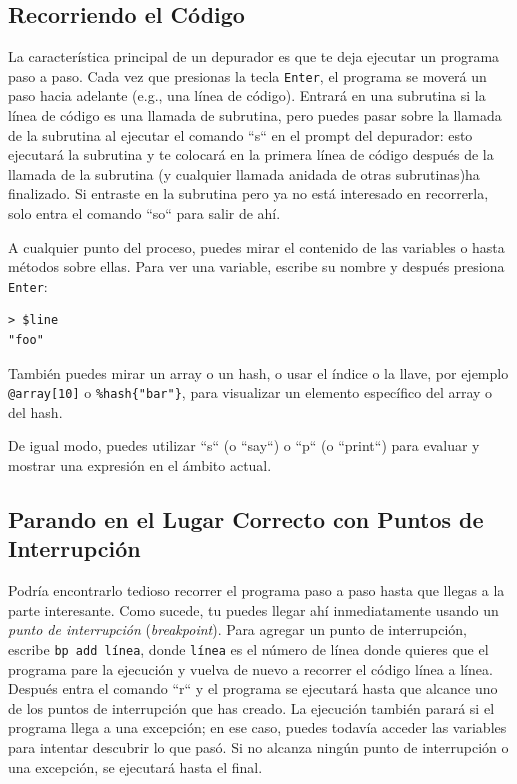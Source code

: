 \subsection{Recorriendo el Código}


La característica principal de un depurador es que
te deja ejecutar un programa paso a paso. Cada vez
que presionas la tecla {\tt Enter}, el programa se
moverá un paso hacia adelante (e.g., una línea de 
código). Entrará en una subrutina si la línea de 
código es una llamada de subrutina, pero puedes pasar 
sobre la llamada de la subrutina al ejecutar el comando
``s`` en el prompt del depurador: esto ejecutará la subrutina
y te colocará en la primera línea de código después de la
llamada de la subrutina (y cualquier llamada anidada de otras
subrutinas)ha finalizado. Si entraste en la subrutina pero ya 
no está interesado en recorrerla, solo entra el comando 
``so`` para salir de ahí.

A cualquier punto del proceso, puedes mirar el contenido 
de las variables o hasta métodos sobre ellas. Para ver
una variable, escribe su nombre y después presiona 
{\tt Enter}:

\begin{lstlisting}
> $line
"foo"
\end{lstlisting}

También puedes mirar un array o un hash, o usar el
índice o la llave, por ejemplo \verb|@array[10]| o
\verb|%hash{"bar"}|, para visualizar un elemento específico
del array o del hash.

De igual modo, puedes utilizar ``s`` (o ``say``) o ``p`` (o ``print``)
para evaluar y mostrar una expresión en el ámbito actual.

\subsection{Parando en el Lugar Correcto con Puntos de Interrupción}

Podría encontrarlo tedioso recorrer el programa paso a paso
hasta que llegas a la parte interesante. Como sucede, 
tu puedes llegar ahí inmediatamente usando un \emph{punto de
interrupción} (\emph{breakpoint}). Para agregar un punto de 
interrupción, escribe {\tt bp add línea}, donde {\tt línea} es
el número de línea donde quieres que el programa pare 
la ejecución y vuelva de nuevo a recorrer el código línea a 
línea. Después entra el comando ``r`` y el programa se ejecutará
hasta que alcance uno de los puntos de interrupción que has creado.
La ejecución también parará si el programa llega a una excepción;
en ese caso, puedes todavía acceder las variables para intentar 
descubrir lo que pasó. Si no alcanza ningún punto de interrupción
o una excepción, se ejecutará hasta el final.

